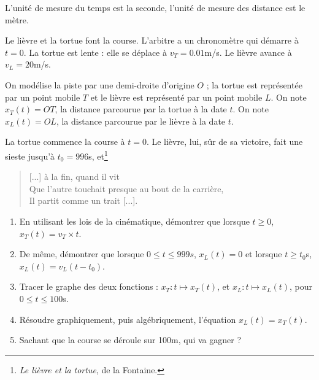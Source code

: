 		\begin{exo}
			L'unité de mesure du temps est la seconde, l'unité de mesure des distance est le mètre.

			Le lièvre et la tortue font la course. L'arbitre a un chronomètre qui démarre à $t=0$. La tortue est lente : elle se déplace à $v_T=0.01$m/s. Le lièvre avance à $v_L=20$m/s. 

			On modélise la piste par une demi-droite d'origine $O$ ; la tortue est représentée par un point mobile $T$ et le lièvre est représenté par un point mobile $L$. On note $x_T(t)=OT$, la distance parcourue par la tortue à la date $t$. On note $x_L(t)=OL$, la distance parcourue par le lièvre à la date $t$. 

			La tortue commence la course à $t=0$. Le lièvre, lui, sûr de sa victoire, fait une sieste jusqu'à $t_0=996$s, et\footnote{\emph{Le lièvre et la tortue}, de la Fontaine.}
			\begin{quote}
				[...] à la fin, quand il  vit \\
			  Que l'autre touchait presque au bout de la carrière, \\
			  Il partit comme un trait [...].
			\end{quote}

			\begin{enumerate}
				\item En utilisant les lois de la cinématique, démontrer que lorsque $t\ge0$, $x_T(t)=v_T\times t$.
				\item De même, démontrer que lorsque $0\le t\le 999s$, $x_L(t)=0$ et lorsque $t\ge t_0$s, $x_L(t)=v_L(t-t_0)$.
				\item Tracer le graphe des deux fonctions : $x_T: t\mapsto x_T(t)$, et $x_L:t\mapsto x_L(t)$, pour $0\le t\le 100$s.
				\item Résoudre graphiquement, puis algébriquement, l'équation $x_L(t)=x_T(t)$.
				\item Sachant que la course se déroule sur 100m, qui va gagner ?
			\end{enumerate}
		\end{exo}





